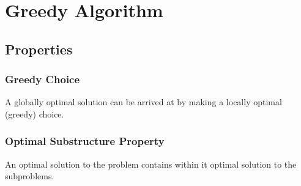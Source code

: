\chapter{Greedy Algorithm}
\newpage

\section{Properties}

\subsection*{Greedy Choice}
A globally optimal solution can be arrived at by making a locally optimal (greedy) choice.

\subsection*{Optimal Substructure Property}
An optimal solution to the problem contains within it optimal solution to the subproblems.

\newpage



\newpage


\newpage


\newpage